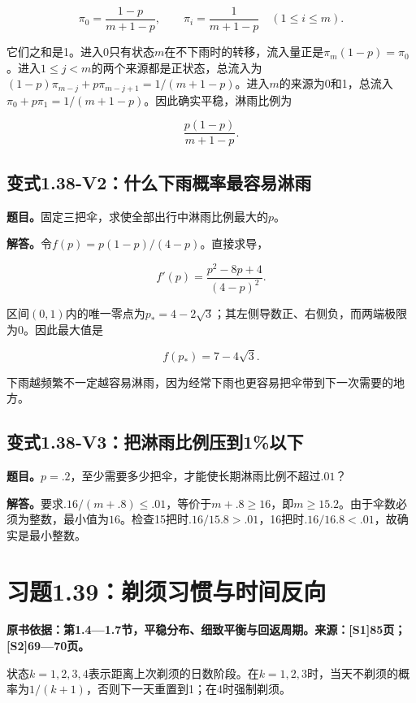 \documentclass[
  11pt,
  a4paper,
  UTF8,
  fontset=fandol]{ctexart}
\begin{document}
\[
\pi_0=\frac{1-p}{m+1-p},\qquad
\pi_i=\frac1{m+1-p}\quad(1\le i\le m).
\]

它们之和是1。进入0只有状态\(m\)在不下雨时的转移，流入量正是\(\pi_m(1-p)=\pi_0\)。进入\(1\le j<m\)的两个来源都是正状态，总流入为\((1-p)\pi_{m-j}+p\pi_{m-j+1}=1/(m+1-p)\)。进入\(m\)的来源为0和1，总流入\(\pi_0+p\pi_1=1/(m+1-p)\)。因此确实平稳，淋雨比例为

\[
\boxed{\frac{p(1-p)}{m+1-p}.}
\]

\subsection{变式1.38-V2：什么下雨概率最容易淋雨}\label{ux53d8ux5f0f1.38-v2ux4ec0ux4e48ux4e0bux96e8ux6982ux7387ux6700ux5bb9ux6613ux6dcbux96e8}

\textbf{题目。}固定三把伞，求使全部出行中淋雨比例最大的\(p\)。

\textbf{解答。}令\(f(p)=p(1-p)/(4-p)\)。直接求导，

\[
f'(p)=\frac{p^2-8p+4}{(4-p)^2}.
\]

区间\((0,1)\)内的唯一零点为\(p_*=4-2\sqrt3\)；其左侧导数正、右侧负，而两端极限为0。因此最大值是

\[
\boxed{f(p_*)=7-4\sqrt3.}
\]

下雨越频繁不一定越容易淋雨，因为经常下雨也更容易把伞带到下一次需要的地方。

\subsection{变式1.38-V3：把淋雨比例压到1\%以下}\label{ux53d8ux5f0f1.38-v3ux628aux6dcbux96e8ux6bd4ux4f8bux538bux52301ux4ee5ux4e0b}

\textbf{题目。}\(p=.2\)，至少需要多少把伞，才能使长期淋雨比例不超过\(.01\)？

\textbf{解答。}要求\(.16/(m+.8)\le.01\)，等价于\(m+.8\ge16\)，即\(m\ge15.2\)。由于伞数必须为整数，最小值为\(\boxed{16}\)。检查15把时\(.16/15.8>.01\)，16把时\(.16/16.8<.01\)，故确实是最小整数。

\section{习题1.39：剃须习惯与时间反向}\label{ux4e60ux98981.39ux5243ux987bux4e60ux60efux4e0eux65f6ux95f4ux53cdux5411}

\textbf{原书依据：第1.4---1.7节，平稳分布、细致平衡与回返周期。来源：{[}S1{]}85页；{[}S2{]}69---70页。}

状态\(k=1,2,3,4\)表示距离上次剃须的日数阶段。在\(k=1,2,3\)时，当天不剃须的概率为\(1/(k+1)\)，否则下一天重置到1；在4时强制剃须。
\end{document}
